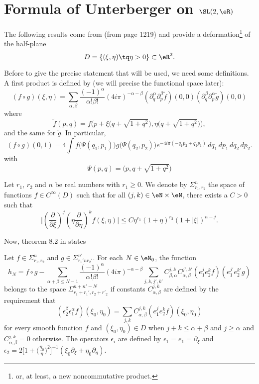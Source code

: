 \section{Formula of Unterberger on \texorpdfstring{$\SL(2,\eR)$}{SL2R} }	\label{SecEplolUnter}

The following results come from \cite{UnterD} (from page 1219) and provide a deformation\footnote{or, at least, a new noncommutative product.} of the half-plane
\[
	D=\{ (\xi,\eta)\tq \eta>0 \}\subset\eR^2.
\]

Before to give the precise statement that will be used, we need some definitions. A first product is defined by (we will precise the functional space later):
\begin{equation}
	(f\circ g)(\xi,\eta)=\sum_{\alpha,\beta}\frac{ (-1)^{\alpha} }{ \alpha !\beta! }(4i\pi)^{-\alpha-\beta}(\partial^{\alpha}_q\partial^{\beta}_p\tilde f)(0,0)(\partial^{\beta}_q\partial^{\alpha}_p\tilde g)(0,0)
\end{equation}
where
\[
	\tilde f(p,q)=f\Big( p+\xi\big(q+\sqrt{1+q^2}\big),\eta\big( q+\sqrt{1+q^2} \big) \Big),
\]
and the same for $\tilde g$. In particular,
\[
	(f\circ g)(0,1)=4\int f\big( \Psi(q_{1},p_{1}) \big)g\big( \Psi(q_{2},p_{2}) \big) e^{ -4i\pi(-q_{1}p_{2}+q_{2}p_{1})}\,dq_{1}\,dp_{1}\,dq_{2}\,dp_{2}.
\]
with
\[
	\Psi(p,q)=\big(p,q+\sqrt{1+q^{2}}\big)
\]

\begin{definition}
	Let $r_1$, $r_2$ and $n$ be real numbers with $r_1\geq 0$. We denote by $\Sigma^{n}_{r_1,r_2}$ the space of functions $f\in  C^{\infty}(D)$ such that for all  $(j,k)\in\eN\times\eN$, there exists a $C>0$ such that
	\begin{equation}
		\Big| \left( \frac{ \partial }{ \partial\xi } \right)^{j}\left( \eta\frac{ \partial }{ \partial\eta } \right)^{k}f(\xi,\eta)  \Big|
		\leq C\eta^{r_1}(1+\eta)^{r_2}(1+| \xi |)^{n-j}.
	\end{equation}
\end{definition}

Now, theorem 8.2 in \cite{UnterD} states
\begin{theorem}
	Let $f\in\Sigma ^n_{r_1,r_2}$ and $g\in\Sigma^{n'}_{r_1'nr_2'}$. For each $N\in\eN_0$, the function
	\begin{equation}
		h_N=f\circ g-\sum_{\alpha+\beta\leq N-1} \frac{ (-1)^{\alpha} }{ \alpha !\beta ! }(4i\pi)^{-\alpha-\beta}\sum_{j,k,j',k'}C_{\beta,\alpha}^{j,k}C_{\alpha,\beta}^{j',k'}(e_1^je_2^kf)(e_1^{j'}e_2^{k'}g)
	\end{equation}
	belongs to the space $\Sigma_{r_1+r_1',r_2+r'_2}^{n+n'-N}$ if constants $C_{\alpha,\beta}^{j,k}$ are defined by the requirement that
	\[
		(\epsilon_2^{\beta}\epsilon_1^{\alpha}f)(\xi_0,\eta_0)=\sum_{j,k}C_{\alpha,\beta}^{j,k}(e_1^je_2^kf)(\xi_0,\eta_0)
	\]
	for every smooth function $f$ and $(\xi_0,\eta_0)\in D$ when $j+k\leq \alpha+\beta$ and $j\geq\alpha$ and $C_{\alpha,\beta}^{j,k}=0$ otherwise.  The operators $\epsilon_i$ are defined by $\epsilon_1=e_1=\partial_{\xi}$ and $\epsilon_2=2\big[ 1+\big( \frac{ \eta_0 }{ \eta } \big)^2 \big]^{-1}(\xi_0\partial_{\xi}+\eta_0\partial_{\eta})$.
	\label{ThoUnterSigmaStable}
\end{theorem}


